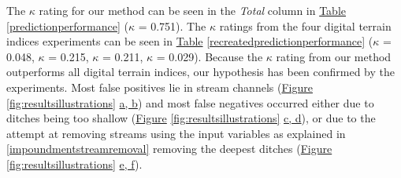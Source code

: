 \documentclass[]{interact}
\theoremstyle{plain}%
\theoremstyle{definition}
\theoremstyle{remark}
\begin{document}
\begin{table}[!htb]
    \label{predictionperformance}
\end{table}

The $\kappa$ rating for our method can be seen in the \textit{Total} column in \hyperref[predictionperformance]{Table} \ref{predictionperformance} ($\kappa$ = 0.751). The $\kappa$ ratings from the four digital terrain indices experiments can be seen in  \hyperref[recreatedpredictionperformance]{Table} \ref{recreatedpredictionperformance} ($\kappa$ = 0.048, $\kappa$ = 0.215, $\kappa$ = 0.211, $\kappa$ = 0.029). Because the $\kappa$ rating from our method outperforms all digital terrain indices, our hypothesis has been confirmed by the experiments. Most false positives lie in stream channels (\hyperref[fig:resultsillustrations]{Figure} \ref{fig:resultsillustrations} \hyperref[fig:resultsillustrations]{a, b}) and most false negatives occurred either due to ditches being too shallow (\hyperref[fig:resultsillustrations]{Figure} \ref{fig:resultsillustrations} \hyperref[fig:resultsillustrations]{c, d}), or due to the attempt at removing streams using the input variables as explained in \ref{impoundmentstreamremoval} removing the deepest ditches  (\hyperref[fig:resultsillustrations]{Figure} \ref{fig:resultsillustrations} \hyperref[fig:resultsillustrations]{e, f}).
\end{document}
